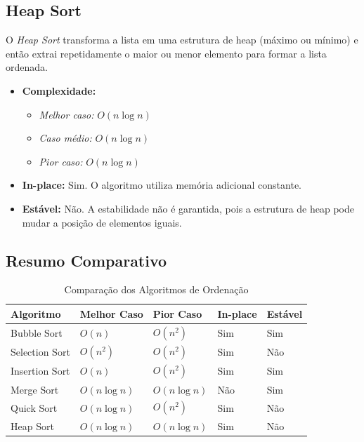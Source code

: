\documentclass[12pt,a4paper]{article}
\begin{document}
\subsection{Heap Sort}
O \textit{Heap Sort} transforma a lista em uma estrutura de heap (máximo ou mínimo) e então extrai repetidamente o maior ou menor elemento para formar a lista ordenada.

\begin{itemize}
    \item \textbf{Complexidade:}
    \begin{itemize}
        \item \textit{Melhor caso:} $O(n \log n)$
        \item \textit{Caso médio:} $O(n \log n)$
        \item \textit{Pior caso:} $O(n \log n)$
    \end{itemize}
    \item \textbf{In-place:} Sim. O algoritmo utiliza memória adicional constante.
    \item \textbf{Estável:} Não. A estabilidade não é garantida, pois a estrutura de heap pode mudar a posição de elementos iguais.
\end{itemize}

\subsection{Resumo Comparativo}

\begin{table}[H]
    \centering
    \begin{tabular}{|l|l|l|l|l|}
        \hline
        \textbf{Algoritmo}   & \textbf{Melhor Caso} & \textbf{Pior Caso} & \textbf{In-place} & \textbf{Estável} \\ \hline
        Bubble Sort    & $O(n)$       & $O(n^2)$    & Sim   & Sim  \\ \hline
        Selection Sort & $O(n^2)$     & $O(n^2)$    & Sim   & Não  \\ \hline
        Insertion Sort & $O(n)$       & $O(n^2)$    & Sim   & Sim  \\ \hline
        Merge Sort     & $O(n \log n)$& $O(n \log n)$& Não  & Sim  \\ \hline
        Quick Sort     & $O(n \log n)$& $O(n^2)$    & Sim   & Não  \\ \hline
        Heap Sort      & $O(n \log n)$& $O(n \log n)$& Sim   & Não  \\ \hline
    \end{tabular}
    \caption{Comparação dos Algoritmos de Ordenação}
\end{table}
\end{document}
